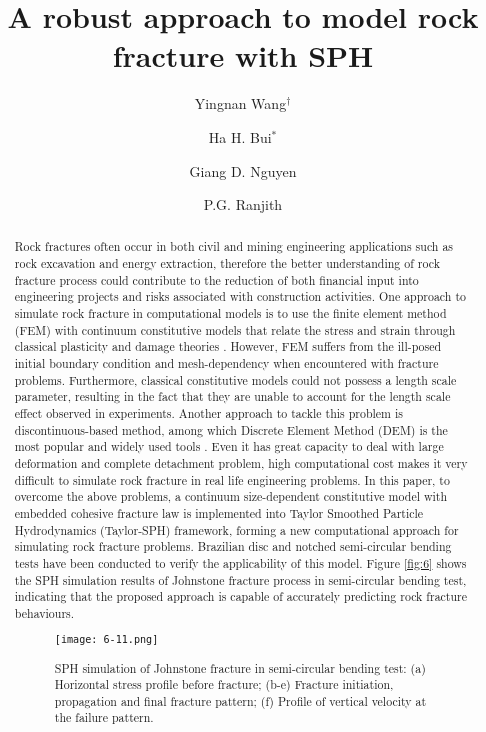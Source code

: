 \documentclass[10pt]{article}
\title{A robust approach to model rock fracture with SPH}
\date{}
\author[1]{Yingnan Wang$^\dagger$}
\author[1]{Ha H. Bui$^*$}
\author[2]{Giang D. Nguyen}
\author[1]{P.G. Ranjith}
\affil[1]{Department of Civil Engineering, Monash University, Clayton, Vic 3800, Australia}
\affil[2]{School of Civil, Environmental and Mining Engineering, The University of Adelaide, SA 5005, Australia}
\affil[$\relax$]{\email{\dagger}{Yingnan.Wang@monash.edu},  \email{*}{Ha.Bui@monash.edu}}
\begin{document}
\maketitle


\begin{abstract}
Rock fractures often occur in both civil and mining engineering applications such as rock excavation and energy extraction, therefore the better understanding of rock fracture process could contribute to the reduction of both financial input into engineering projects and risks associated with construction activities. One approach to simulate rock fracture in computational models is to use the finite element method (FEM) with continuum constitutive models that relate the stress and strain through classical plasticity and damage theories \cite{molladavoodi2011damage}. However, FEM suffers from the ill-posed initial boundary condition and mesh-dependency when encountered with fracture problems. Furthermore, classical constitutive models could not possess a length scale parameter, resulting in the fact that they are unable to account for the length scale effect observed in experiments. Another approach to tackle this problem is discontinuous-based method, among which Discrete Element Method (DEM) is the most popular and widely used tools \cite{cundall1979discrete}. Even it has great capacity to deal with large deformation and complete detachment problem, high computational cost makes it very difficult to simulate rock fracture in real life engineering problems. In this paper, to overcome the above problems, a continuum size-dependent constitutive model with embedded cohesive fracture law is implemented into Taylor Smoothed Particle Hydrodynamics (Taylor-SPH) framework, forming a new computational approach for simulating rock fracture problems. Brazilian disc and notched semi-circular bending tests have been conducted to verify the applicability of this model. Figure \ref{fig:6} shows the SPH simulation results of Johnstone fracture process in semi-circular bending test, indicating that the proposed approach is capable of accurately predicting rock fracture behaviours. 
\begin{figure}[!htb]
\centering
\texttt{[image: 6-11.png]}
\caption{SPH simulation of Johnstone fracture in semi-circular bending test: (a) Horizontal stress profile before fracture; (b-e) Fracture initiation, propagation and final fracture pattern; (f) Profile of vertical velocity at the failure pattern.}\label{fig:6}
\end{figure}

\end{abstract}



\addbib
\end{document}
